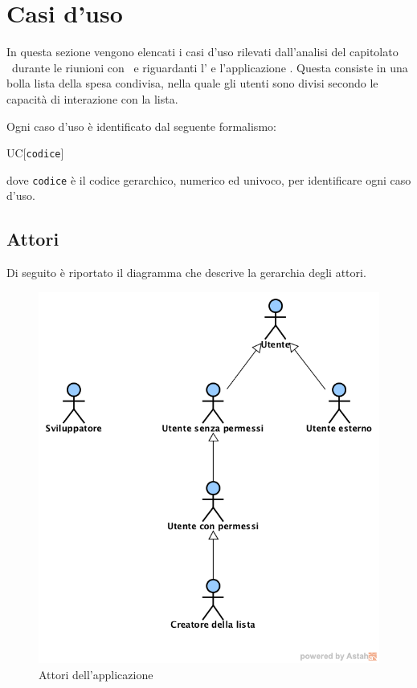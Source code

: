 \section{Casi d'uso}
In questa sezione vengono elencati i casi d'uso rilevati dall'analisi del capitolato \capitolato\ durante le riunioni con \RB\ e riguardanti l' e l'applicazione . Questa consiste in una bolla lista della spesa condivisa, nella quale gli utenti sono divisi secondo le capacità di interazione con la lista.

Ogni caso d'uso è identificato dal seguente formalismo:
\begin{center}
	UC[\texttt{codice}]
\end{center}
dove \texttt{codice} è il codice gerarchico, numerico ed univoco, per identificare ogni caso d'uso.

\subsection{Attori}
Di seguito è riportato il diagramma  che descrive la gerarchia degli attori.

\label{Attori}
\begin{figure}[ht]
	\centering
	\includegraphics[scale=0.5]{Usecases/img/Attori.png}
	\caption{Attori dell'applicazione}
\end{figure}

